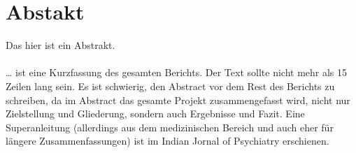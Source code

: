 \section{Abstakt}
Das hier ist ein Abstrakt. \\\\
… ist eine Kurzfassung des gesamten Berichts. Der Text sollte nicht mehr als
15 Zeilen lang sein. Es ist schwierig, den Abstract vor dem Rest des Berichts zu
schreiben, da im Abstract das gesamte Projekt zusammengefasst wird, nicht
nur Zielstellung und Gliederung, sondern auch Ergebnisse und Fazit. Eine
Superanleitung (allerdings aus dem medizinischen Bereich und auch eher für
längere Zusammenfassungen) ist im Indian Jornal of Psychiatry erschienen.
